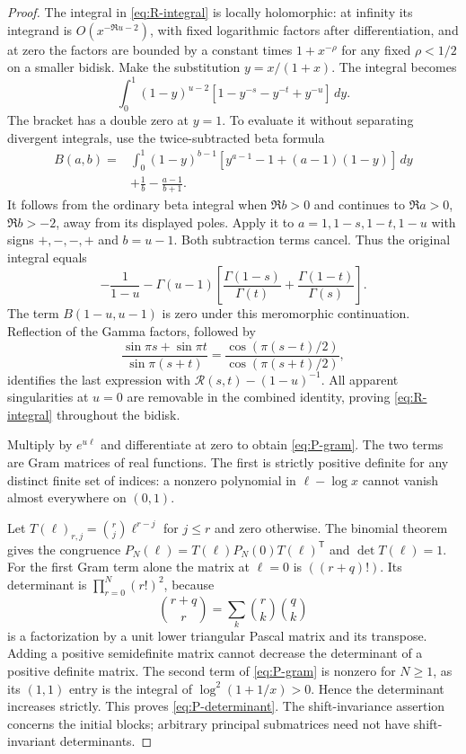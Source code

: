 \documentclass[11pt,a4paper]{article}
\numberwithin{equation}{section}
\theoremstyle{definition}
\theoremstyle{remark}
\begin{document}
\begin{proof}
The integral in \eqref{eq:R-integral} is locally holomorphic: at
infinity its integrand is $O(x^{-\Re u-2})$, with fixed logarithmic
factors after differentiation, and at zero the factors are bounded
by a constant times $1+x^{-\rho}$ for any fixed $\rho<1/2$ on a
smaller bidisk. Make the substitution $y=x/(1+x)$. The integral
becomes
\[
 \int_0^1(1-y)^{u-2}
       [1-y^{-s}-y^{-t}+y^{-u}]\,dy.
\]
The bracket has a double zero at $y=1$. To evaluate it without
separating divergent integrals, use the twice-subtracted beta formula
\begin{align*}
 B(a,b)={}&\int_0^1(1-y)^{b-1}
       [y^{a-1}-1+(a-1)(1-y)]\,dy\\
 &+\frac1b-\frac{a-1}{b+1}.
\end{align*}
It follows from the ordinary beta integral when $\Re b>0$ and
continues to $\Re a>0$, $\Re b>-2$, away from its displayed poles.
Apply it to $a=1,1-s,1-t,1-u$ with signs $+,-,-,+$ and
$b=u-1$. Both subtraction terms cancel. Thus the original integral
equals
\[
 -\frac1{1-u}-\Gamma(u-1)
 \left[\frac{\Gamma(1-s)}{\Gamma(t)}
             +\frac{\Gamma(1-t)}{\Gamma(s)}\right].
\]
The term $B(1-u,u-1)$ is zero under this meromorphic continuation.
Reflection of the Gamma factors, followed by
\[
 \frac{\sin\pi s+\sin\pi t}{\sin\pi(s+t)}
 =\frac{\cos(\pi(s-t)/2)}{\cos(\pi(s+t)/2)},
\]
identifies the last expression with $\mathcal R(s,t)-(1-u)^{-1}$.
All apparent singularities at $u=0$ are removable in the combined
identity, proving \eqref{eq:R-integral} throughout the bidisk.

Multiply by $e^{u\ell}$ and differentiate at zero to obtain
\eqref{eq:P-gram}. The two terms are Gram matrices of real functions.
The first is strictly positive definite for any distinct finite
set of indices: a nonzero polynomial in $\ell-\log x$ cannot
vanish almost everywhere on $(0,1)$.

Let $T(\ell)_{r,j}=\binom rj\ell^{r-j}$ for $j\leq r$ and zero
otherwise. The binomial theorem gives the congruence
$P_N(\ell)=T(\ell)P_N(0)T(\ell)^{\mathsf T}$ and
$\det T(\ell)=1$. For the first Gram term alone the matrix at
$\ell=0$ is $((r+q)!)$. Its determinant is
$\prod_{r=0}^N(r!)^2$, because
\[
 \binom{r+q}{r}=\sum_k\binom rk\binom qk
\]
is a factorization by a unit lower triangular Pascal matrix and its
transpose. Adding a positive semidefinite matrix cannot decrease
the determinant of a positive definite matrix. The second term of
\eqref{eq:P-gram} is nonzero for $N\geq1$, as its $(1,1)$ entry is
the integral of $\log^2(1+1/x)>0$. Hence the determinant increases
strictly. This proves \eqref{eq:P-determinant}. The shift-invariance
assertion concerns the initial blocks; arbitrary principal submatrices
need not have shift-invariant determinants.
\end{proof}
\end{document}
